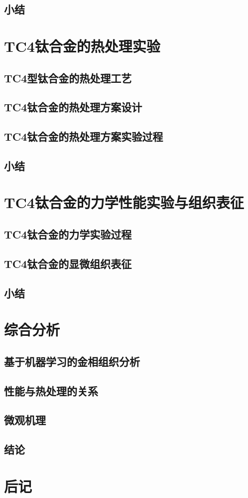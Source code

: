 \documentclass[
class = book,
zihao = -4,
font = noto,
paper = a4paper,
openany
]{easybook}
\begin{document}
	\section{小结}

	\chapter{TC4钛合金的热处理实验}
	\section{TC4型钛合金的热处理工艺}
	\section{TC4钛合金的热处理方案设计}
	\section{TC4钛合金的热处理方案实验过程}
	\section{小结}

	\chapter{TC4钛合金的力学性能实验与组织表征}
	\section{TC4钛合金的力学实验过程}
	\section{TC4钛合金的显微组织表征}
	\section{小结}

	\chapter{综合分析}
	\section{基于机器学习的金相组织分析}
	\section{性能与热处理的关系}
	\section{微观机理}
	\section{结论}

	\chapter{后记}

\end{document}
